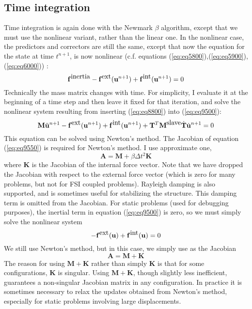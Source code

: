 \documentclass{article}
\begin{document}
\subsection{Time integration}
Time integration is again done with the Newmark $\beta$ algorithm, except that we must use the nonlinear variant, rather than the linear one.
In the nonlinear case, the predictors and correctors are still the same, except that now the equation for the state at time $t^{n+1}$, is now nonlinear (c.f. equations (\ref{eq:eq5800}),(\ref{eq:eq5900}),(\ref{eq:eq6000}))  :
\begin{equation} \mathbf{f}^{\mbox{inertia}} - \mathbf{f}^{\mbox{ext}}({\bf u}^{n+1}) + \mathbf{f}^{\mbox{int}}({\bf u}^{n+1}) = 0 \label{eq:eq9500} \end{equation}
Technically the mass matrix changes with time.
For simplicity, I evaluate it at the beginning of a time step and then leave it fixed for that iteration, and solve the nonlinear system resulting from inserting (\ref{eq:eq8800}) into (\ref{eq:eq9500}):
\begin{equation} \mathbf{M}{\ddot {\bf u}}^{n+1} - \mathbf{f}^{\mbox{ext}}({\bf u}^{n+1}) + \mathbf{f}^{\mbox{int}}({\bf u}^{n+1}) + {\bf T}^T {\bf M}^{\mbox{slave}} \dot{\bf T} \dot{\bf u}^{n+1} = 0 \label{eq:eq9550} \end{equation}
This equation can be solved using Newton's method.  
The Jacobian of equation (\ref{eq:eq9550}) is required for Newton's method. 
I use approximate one, 
\begin{equation} \mathbf{A} = \mathbf{M} + \beta\Delta t^2 \mathbf{K} \label{eq:eq9600} \end{equation}
where $\mathbf{K}$ is the Jacobian of the internal force vector.  
Note that we have dropped the Jacobian with respect to the external force vector (which is zero for many problems, but not for FSI coupled problems).
Rayleigh damping is also supported, and is sometimes useful for stabilizing the structure.  
This damping term is omitted from the Jacobian.
For static problems (used for debugging purposes), the inertial term in equation (\ref{eq:eq9500}) is zero, so we must simply solve the nonlinear system
\begin{equation} - \mathbf{f}^{\mbox{ext}}({\bf u}) + \mathbf{f}^{\mbox{int}}({\bf u}) = 0 \label{eq:eq9700} \end{equation}
We still use Newton's method, but in this case, we simply use as the Jacobian
\begin{equation} \mathbf{A} = \mathbf{M} + \mathbf{K}  \label{eq:eq9800} \end{equation}
The reason for using $\mathbf{M} + \mathbf{K}$ rather than simply $\mathbf{K}$ is that for some configurations, $\mathbf{K}$ is singular.
Using $\mathbf{M} + \mathbf{K}$, though slightly less inefficient, guarantees a non-singular Jacobian matrix in any configuration.
In practice it is sometimes necessary to relax the updates obtained from Newton's method, especially for static problems involving large displacements.
\end{document}
